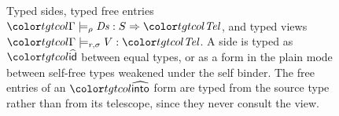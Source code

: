 \begin{figure}
\small
\color{tgtcol}
\color{black}
\caption{Typed sides, typed free entries $\entjm{\Gamma}{\rho}{\mathit{Ds}}{S}{\tel}$, and typed views $\viewj{\Gamma}{r}{\sigma}{V}{\tel}$. A side is typed as $\form{id}$ between equal types, or as a form in the plain mode between self-free types weakened under the self binder. The free entries of an $\form{into}$ form are typed from the source type rather than from its telescope, since they never consult the view.}
\label{fig:formtyped-views}
\end{figure}

